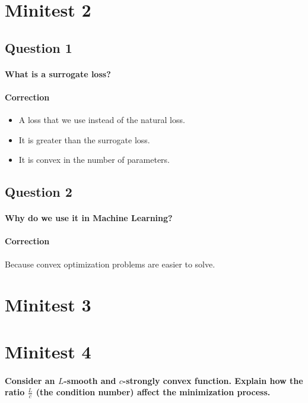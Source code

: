 \documentclass{article}
\newcommand{\1}{\mathbf{1}}
\begin{document}
\section{Minitest 2}
\subsection{Question 1}
\paragraph{What is a surrogate loss?}
\paragraph{Correction}
\begin{itemize}
  \item A loss that we use instead of the natural loss.
  \item It is greater than the surrogate loss.
  \item It is convex in the number of parameters.
\end{itemize}

\subsection{Question 2}
\paragraph{Why do we use it in Machine Learning?}
\paragraph{Correction}
Because convex optimization problems are easier to solve.



\section{Minitest 3}

\section{Minitest 4}
\paragraph{Consider an \(L\)-smooth and \(c\)-strongly convex function. Explain how the ratio \(\frac{L}{c}\) (the condition number) affect the minimization process.}
\end{document}
